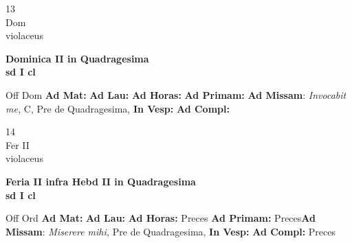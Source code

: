 \documentclass[10pt, openany]{book}
\begin{document}
    \begin{center}
        \begin{minipage}{3.5in}
            \vspace{2em}
            \begin{minipage}{0.5in}
                {\Huge 13} \\
                {\normalsize Dom} \\
                {\normalsize violaceus}
            \end{minipage}
            \begin{minipage}{3.0in}
                \textbf{ \large Dominica II in Quadragesima \\
                \textnormal{\normalsize sd I cl}} \\ 
            \end{minipage}
            \begin{justify}Off Dom
                \textbf{Ad Mat: }
                \textbf{Ad Lau: }
                \textbf{Ad Horas: }
                \textbf{Ad Primam: }\textbf{Ad Missam}: \textit{Invocabit me,} C, Pre de Quadragesima,  
                \textbf{In Vesp: }
                \textbf{Ad Compl: }
            \end{justify}
        \end{minipage}
    \end{center}

    \begin{center}
        \begin{minipage}{3.5in}
            \vspace{2em}
            \begin{minipage}{0.5in}
                {\Huge 14} \\
                {\normalsize Fer II} \\
                {\normalsize violaceus}
            \end{minipage}
            \begin{minipage}{3.0in}
                \textbf{ \large Feria II infra Hebd II in Quadragesima \\
                \textnormal{\normalsize sd I cl}} \\ 
            \end{minipage}
            \begin{justify}Off Ord
                \textbf{Ad Mat: }
                \textbf{Ad Lau: }
                \textbf{Ad Horas: }Preces
                \textbf{Ad Primam: }Preces\textbf{Ad Missam}: \textit{Miserere mihi,} Pre de Quadragesima,  
                \textbf{In Vesp: }
                \textbf{Ad Compl: }Preces
            \end{justify}
        \end{minipage}
    \end{center}
\end{document}
